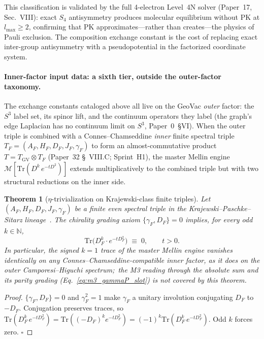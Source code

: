 \documentclass[aps,pra,twocolumn,superscriptaddress,longbibliography]{revtex4-2}
\newtheorem{theorem}{Theorem}
\begin{document}
This classification is validated by the full 4-electron Level~4N
solver (Paper~17, Sec.~VIII): exact $S_4$ antisymmetry produces
molecular equilibrium without PK at $l_{\max} \geq 2$, confirming
that PK approximates---rather than creates---the physics of Pauli
exclusion.  The composition exchange constant is the cost of
replacing exact inter-group antisymmetry with a pseudopotential
in the factorized coordinate system.

\paragraph{Inner-factor input data: a sixth tier, outside
the outer-factor taxonomy.}
The exchange constants cataloged above all live on the GeoVac
\emph{outer} factor: the $S^3$ label set, its spinor lift, and the
continuum operators they label (the graph's edge Laplacian has no
continuum limit on $S^3$, Paper~0~\S VI).  When the outer triple is
combined with a Connes--Chamseddine \emph{inner} finite spectral
triple $T_F = (A_F, H_F, D_F, J_F, \gamma_F)$ to form an
almost-commutative product $T = T_{\mathrm{GV}} \otimes T_F$
(Paper~32 \S~VIII.C; Sprint~H1), the master Mellin engine
$\mathcal{M}[\mathrm{Tr}(D^k\,e^{-tD^2})]$ extends multiplicatively
to the combined triple but with two structural reductions on the
inner side.

\begin{theorem}[$\eta$-trivialization on Krajewski-class finite
triples]
\label{thm:eta_trivialization}
Let $(A_F, H_F, D_F, J_F, \gamma_F)$ be a finite even spectral triple
in the Krajewski--Paschke--Sitarz lineage~\cite{krajewski1998,
paschke_sitarz2000}.  The chirality grading axiom
$\{\gamma_F, D_F\} = 0$ implies, for every odd $k \in \mathbb{N}$,
\begin{equation}\label{eq:eta_trivial}
  \mathrm{Tr}\bigl(D_F^k \cdot e^{-t D_F^2}\bigr) \;\equiv\; 0,
  \qquad t > 0.
\end{equation}
In particular, the signed $k = 1$ trace of the master Mellin engine
vanishes identically on any Connes--Chamseddine-compatible inner
factor, as it does on the outer Camporesi--Higuchi spectrum;\ the M3
reading through the absolute sum and its parity grading
(Eq.~\eqref{eq:m3_gammaP_slot}) is not covered by this theorem.
\end{theorem}

\begin{proof}
$\{\gamma_F, D_F\} = 0$ and $\gamma_F^2 = 1$ make $\gamma_F$ a unitary
involution conjugating $D_F$ to $-D_F$.  Conjugation preserves
traces, so $\mathrm{Tr}(D_F^k\,e^{-tD_F^2}) = \mathrm{Tr}((-D_F)^k
e^{-tD_F^2}) = (-1)^k \mathrm{Tr}(D_F^k\,e^{-tD_F^2})$.  Odd $k$
forces zero. $\square$
\end{proof}
\end{document}
